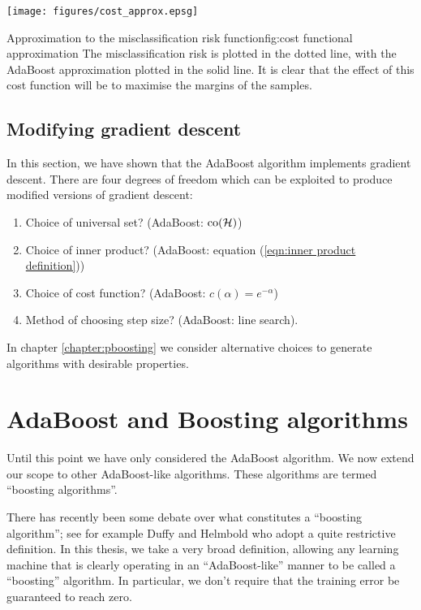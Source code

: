 \begin{linefigure}
\begin{center}
\texttt{[image: figures/cost\_approx.epsg]}
\end{center}
\begin{capt}{Approximation to the misclassification risk
function}{fig:cost functional approximation}
The misclassification risk is plotted in the dotted line, with the
AdaBoost approximation plotted in the solid line.  It is clear that
the effect of this cost function will be to maximise the margins of
the samples.
\end{capt}
\end{linefigure}

\subsection{Modifying gradient descent}

In this section, we have shown that the AdaBoost algorithm implements
gradient descent.  There are four degrees of freedom which can be
exploited to produce modified versions of gradient descent:
%
\begin{enumerate}
\item	Choice of universal set? (AdaBoost: $\mathrm{co}(\mathcal{H})$)
\item	Choice of inner product? (AdaBoost: equation (\ref{eqn:inner
	product definition}))
\item	Choice of cost function? (AdaBoost: $c(\alpha) =
	e^{-\alpha}$)
\item	Method of choosing step size? (AdaBoost: line search).
\end{enumerate}
%
In chapter \ref{chapter:pboosting} we consider alternative choices to
generate algorithms with desirable properties.


\section{AdaBoost and Boosting algorithms}

Until this point we have only considered the AdaBoost algorithm.  We
now extend our scope to other AdaBoost-like algorithms.  These
algorithms are termed ``boosting algorithms''.

There has recently been some debate over what constitutes a ``boosting
algorithm''; see for example Duffy and Helmbold \cite{Duffy99} who
adopt a quite restrictive definition.  In this thesis, we take a very
broad definition, allowing any learning machine that is clearly
operating in an ``AdaBoost-like'' manner to be called a ``boosting''
algorithm.  In particular, we don't require that the training error be
guaranteed to reach zero.


